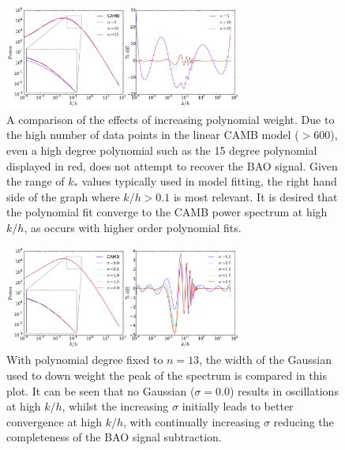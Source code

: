 \documentclass[iop,twocolappendix]{emulateapj}
\begin{document}
	
	\begin{figure}
		\begin{center}
			\includegraphics[width=0.7\textwidth]{images/ApolyDegree.pdf}
			\caption{A comparison of the effects of increasing polynomial weight. Due to the high number of data points in the linear CAMB model ($>600$), even a high degree polynomial such as the 15 degree polynomial displayed in red, does not attempt to recover the BAO signal. Given the range of $k_*$ values typically used in model fitting, the right hand side of the graph where $k/h > 0.1$ is most relevant. It is desired that the polynomial fit converge to the CAMB power spectrum at high $k/h$, as occurs with higher order polynomial fits.}
			\label{fig:ApolyDegree}
		\end{center}
	\end{figure}
	\begin{figure}
		\begin{center}
			\includegraphics[width=0.7\textwidth]{images/ApolySigma.pdf}
			\caption{With polynomial degree fixed to $n = 13$, the width of the Gaussian used to down weight the peak of the spectrum is compared in this plot. It can be seen that no Gaussian ($\sigma= 0.0$) results in oscillations at high $k/h$, whilst the increasing $\sigma$ initially leads to better convergence at high $k/h$, with continually increasing $\sigma$ reducing the completeness of the BAO signal subtraction.}
			\label{fig:ApolySigma}
		\end{center}
	\end{figure}
\end{document}
